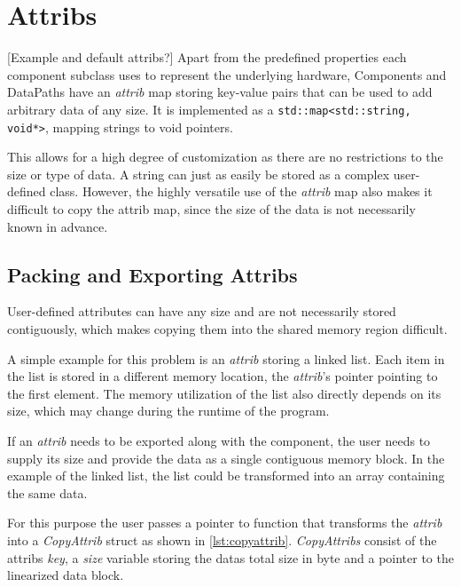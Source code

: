 \section{Attribs}\label{section:attribs}
[Example and default attribs?] %
Apart from the predefined properties each component subclass uses to represent the underlying hardware, Components and DataPaths have an \emph{attrib} map storing key-value pairs that can be used to add arbitrary data of any size.
It is implemented as a \lstinline{std::map<std::string, void*>}, mapping strings to void pointers.

This allows for a high degree of customization as there are no restrictions to the size or type of data. A string can just as easily be stored as a complex user-defined class.
However, the highly versatile use of the \emph{attrib} map also makes it difficult to copy the attrib map, since the size of the data is not necessarily known in advance.

\subsection{Packing and Exporting Attribs}\label{subsection:packing_and_exporting}
User-defined attributes can have any size and are not necessarily stored contiguously, which makes copying them into the shared memory region difficult.

A simple example for this problem is an \emph{attrib} storing a linked list. Each item in the list is stored in a different memory location,
the \emph{attrib}'s pointer pointing to the first element. The memory utilization of the list also directly depends on its size, which may change during the runtime of the program.

If an \emph{attrib} needs to be exported along with the component, the user needs to supply its size and provide the data as a single contiguous memory block.
In the example of the linked list, the list could be transformed into an array containing the same data.

For this purpose the user passes a pointer to function that transforms the \emph{attrib} into a \emph{CopyAttrib} struct as shown in \autoref{lst:copyattrib}.
\emph{CopyAttribs} consist of the attribs \emph{key}, a \emph{size} variable storing the datas total size in byte and a pointer to the linearized data block.

